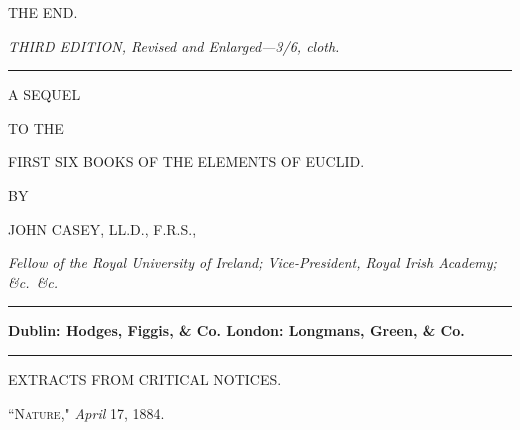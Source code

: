 \documentclass[oneside]{book}
\begin{document}
\begin{center}
THE END.
\end{center}





\newpage
\begin{center}
\textit{\textsf{THIRD EDITION, Revised and Enlarged---3/6, cloth.}}

\rule[1ex]{1cm}{1pt}
\bigskip

{\LARGE \textsf{A SEQUEL}}

\medskip
{\tiny TO THE}

\medskip
{\large FIRST SIX BOOKS OF THE ELEMENTS
OF EUCLID.}
\bigskip

{\footnotesize BY}

\bigskip
{\Large JOHN CASEY, LL\@.D., F.R.S.,}

\medskip
\textit{\textsf{Fellow of the Royal University of Ireland; Vice-President, Royal
Irish Academy; \&c.\ \&c.}}
\bigskip

\rule[1ex]{3cm}{1pt}

\textbf{Dublin: Hodges, Figgis, \& Co.\quad
London: Longmans, Green, \& Co.}

\medskip
\rule[1ex]{3cm}{1pt}
\bigskip

{\large \textsf{EXTRACTS FROM CRITICAL NOTICES.}}

\medskip
``\textsc{Nature}," \textit{April} 17, 1884.
\end{center}
\nopagebreak
\end{document}
